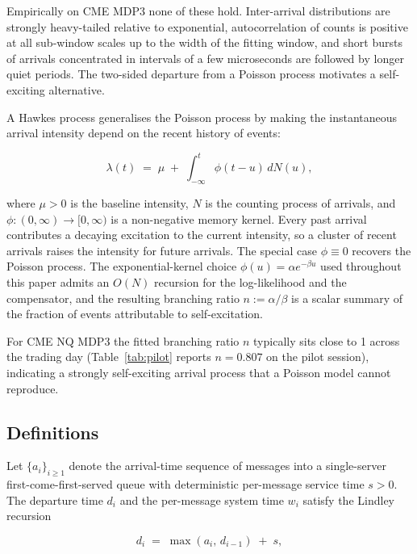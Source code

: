 \documentclass[11pt]{article}
\begin{document}
Empirically on CME MDP3 none of these hold. Inter-arrival distributions are strongly heavy-tailed relative to exponential, autocorrelation of counts is positive at all sub-window scales up to the width of the fitting window, and short bursts of arrivals concentrated in intervals of a few microseconds are followed by longer quiet periods. The two-sided departure from a Poisson process motivates a self-exciting alternative.

A Hawkes process \citep{hawkes1971spectra} generalises the Poisson process by making the instantaneous arrival intensity depend on the recent history of events:

\begin{equation}
\label{eq:hawkesgeneral}
\lambda(t) \;=\; \mu \;+\; \int_{-\infty}^{t} \phi(t - u) \, dN(u),
\end{equation}

where $\mu > 0$ is the baseline intensity, $N$ is the counting process of arrivals, and $\phi: (0, \infty) \to [0, \infty)$ is a non-negative memory kernel. Every past arrival contributes a decaying excitation to the current intensity, so a cluster of recent arrivals raises the intensity for future arrivals. The special case $\phi \equiv 0$ recovers the Poisson process. The exponential-kernel choice $\phi(u) = \alpha e^{-\beta u}$ used throughout this paper admits an $O(N)$ recursion for the log-likelihood and the compensator, and the resulting branching ratio $n := \alpha/\beta$ is a scalar summary of the fraction of events attributable to self-excitation.

For CME NQ MDP3 the fitted branching ratio $n$ typically sits close to 1 across the trading day (Table~\ref{tab:pilot} reports $n = 0.807$ on the pilot session), indicating a strongly self-exciting arrival process that a Poisson model cannot reproduce.

\subsection{Definitions}
\label{sec:queue-defs}

Let $\{a_i\}_{i \geq 1}$ denote the arrival-time sequence of messages into a single-server first-come-first-served queue with deterministic per-message service time $s > 0$. The departure time $d_i$ and the per-message system time $w_i$ satisfy the Lindley recursion

\begin{equation}
\label{eq:lindley-d}
d_i \;=\; \max(a_i,\, d_{i-1}) \;+\; s,
\end{equation}
\end{document}
